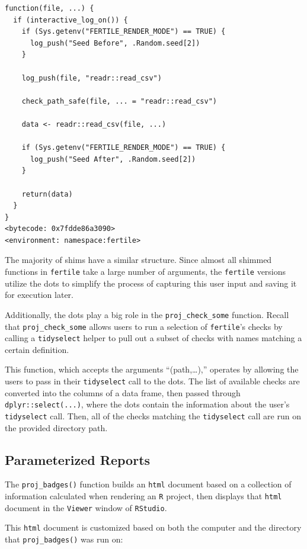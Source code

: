 \documentclass[12pt,twoside]{reedthesis}
\begin{document}
\begin{verbatim}
function(file, ...) {
  if (interactive_log_on()) {
    if (Sys.getenv("FERTILE_RENDER_MODE") == TRUE) {
      log_push("Seed Before", .Random.seed[2])
    }

    log_push(file, "readr::read_csv")

    check_path_safe(file, ... = "readr::read_csv")

    data <- readr::read_csv(file, ...)

    if (Sys.getenv("FERTILE_RENDER_MODE") == TRUE) {
      log_push("Seed After", .Random.seed[2])
    }

    return(data)
  }
}
<bytecode: 0x7fdde86a3090>
<environment: namespace:fertile>
\end{verbatim}
The majority of shims have a similar structure. Since almost all shimmed functions in \texttt{fertile} take a large number of arguments, the \texttt{fertile} versions utilize the dots to simplify the process of capturing this user input and saving it for execution later.

Additionally, the dots play a big role in the \texttt{proj\_check\_some} function. Recall that \texttt{proj\_check\_some} allows users to run a selection of \texttt{fertile}'s checks by calling a \texttt{tidyselect} helper to pull out a subset of checks with names matching a certain definition.

This function, which accepts the arguments ``(path,\ldots),'' operates by allowing the users to pass in their \texttt{tidyselect} call to the dots. The list of available checks are converted into the columns of a data frame, then passed through \texttt{dplyr::select(...)}, where the dots contain the information about the user's \texttt{tidyselect} call. Then, all of the checks matching the \texttt{tidyselect} call are run on the provided directory path.

\hypertarget{parameterized-reports}{%
\subsection{Parameterized Reports}\label{parameterized-reports}}

The \texttt{proj\_badges()} function builds an \texttt{html} document based on a collection of information calculated when rendering an \texttt{R} project, then displays that \texttt{html} document in the \texttt{Viewer} window of \texttt{RStudio}.

This \texttt{html} document is customized based on both the computer and the directory that \texttt{proj\_badges()} was run on:
\end{document}
